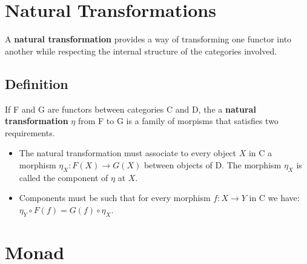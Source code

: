 \documentclass{article}
\begin{document}
\section{Natural Transformations}
A \textbf{natural transformation} provides a way of transforming one functor 
into another while respecting the internal structure of the categories involved.

\subsection{Definition}
If F and G are functors between categories C and D, the a \textbf{natural 
transformation} \(\eta\) from F to G is a family of morpisms that satisfies two 
requirements.

\begin{itemize}

\item
  The natural transformation must associate to every object \(X\) in C a 
  morphism \(\eta_{X}\colon F(X) \to G(X)\) between objects of D. The morphism 
  \(\eta_{X}\) is called the component of \(\eta\) at \(X\).

\item
  Components must be such that for every morphism \(f\colon X \to Y\) in C we 
  have: \(\eta_{Y} \circ F(f) = G(f) \circ \eta_{X}\).

\end{itemize}

\section{Monad}
\end{document}
